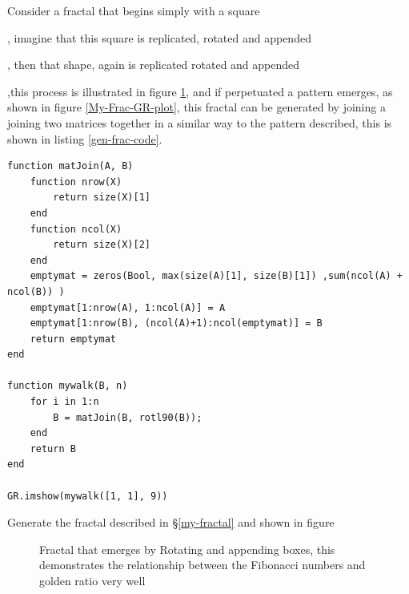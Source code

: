 \documentclass[a4paper,11pt,twoside]{article}
\begin{document}
Consider a fractal that begins simply with a square
  ,
imagine that this square is replicated, rotated and appended
, then that shape, again is replicated rotated and appended
,this    process is illustrated in figure \ref{My-Frac-progression-ink}, and if perpetuated a pattern emerges, as shown in figure \ref{My-Frac-GR-plot}, this fractal can be generated by joining a joining two matrices together in a similar way to the pattern described, this is shown in listing \ref{gen-frac-code}.

\begin{listing}[htbp]
\begin{verbatim}
function matJoin(A, B)
    function nrow(X)
        return size(X)[1]
    end
    function ncol(X)
        return size(X)[2]
    end
    emptymat = zeros(Bool, max(size(A)[1], size(B)[1]) ,sum(ncol(A) + ncol(B)) )
    emptymat[1:nrow(A), 1:ncol(A)] = A
    emptymat[1:nrow(B), (ncol(A)+1):ncol(emptymat)] = B
    return emptymat
end

function mywalk(B, n)
    for i in 1:n
        B = matJoin(B, rotl90(B));
    end
    return B
end

GR.imshow(mywalk([1, 1], 9))
\end{verbatim}
\caption{\label{gen-frac-code}Generate the fractal described in \S \ref{my-fractal} and shown in figure }
\end{listing}



\begin{figure}[htbp]
\centering

\caption{\label{My-Frac-progression-ink}Fractal that emerges by Rotating and appending boxes, this demonstrates the relationship between the Fibonacci numbers and golden ratio very well}
\end{figure}
\end{document}
